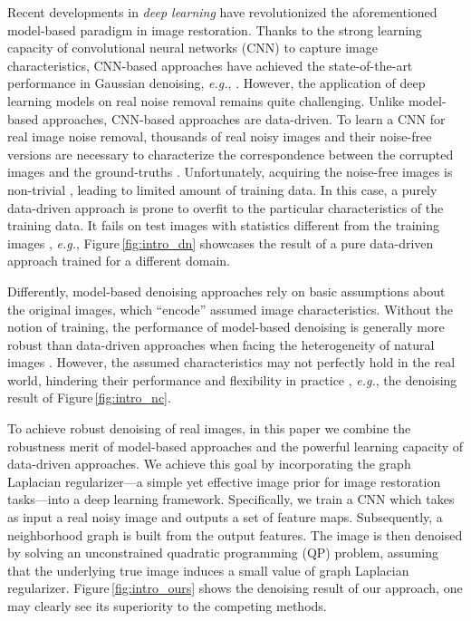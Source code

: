 \documentclass[10pt,twocolumn,letterpaper]{article}
\begin{document}
Recent developments in \emph{deep learning} have revolutionized the aforementioned model-based paradigm in image restoration. 
Thanks to the strong learning capacity of convolutional neural networks (CNN) to capture image characteristics, CNN-based approaches have achieved the state-of-the-art performance in Gaussian denoising, {\it e.g.}, \cite{zhang2017beyond,vemulapalli2016deep,tai2017memnet}. 
However, the application of deep learning models on real noise removal remains quite challenging. 
Unlike model-based approaches, CNN-based approaches are data-driven. 
To learn a CNN for real image noise removal, thousands of real noisy images and their noise-free versions are necessary to characterize the correspondence between the corrupted images and the ground-truths \cite{zhu2016noise}.
Unfortunately, acquiring the noise-free images is non-trivial \cite{xu2017multi,chen2018learning}, leading to limited amount of training data. 
In this case, a purely data-driven approach is prone to overfit to the particular characteristics of the training data. 
It fails on test images with statistics different from the training images \cite{mccann2017convolutional}, {\it e.g.}, Figure\,\ref{fig:intro_dn} showcases the result of a pure data-driven approach trained for a different domain.
	
Differently, model-based denoising approaches rely on basic assumptions about the original images, which ``encode'' assumed image characteristics. 
Without the notion of training, the performance of model-based denoising is generally more robust than data-driven approaches when facing the heterogeneity of natural images \cite{dong2018denoising}. 
However, the assumed characteristics may not perfectly hold in the real world, hindering their performance and flexibility in practice \cite{milanfar2013tour}, {\it e.g.}, the denoising result of Figure\,\ref{fig:intro_nc}.

To achieve robust denoising of real images, in this paper we combine the robustness merit of model-based approaches and the powerful learning capacity of data-driven approaches. 
We achieve this goal by incorporating the graph Laplacian regularizer---a simple yet effective image prior for image restoration tasks---into a deep learning framework. 
Specifically, we train a CNN which takes as input a real noisy image and outputs a set of feature maps. 
Subsequently, a neighborhood graph is built from the output features. 
The image is then denoised by solving an unconstrained quadratic programming (QP) problem, assuming that the underlying true image induces a small value of graph Laplacian regularizer. 
Figure\,\ref{fig:intro_ours} shows the denoising result of our approach, one may clearly see its superiority to the competing methods.
\end{document}
